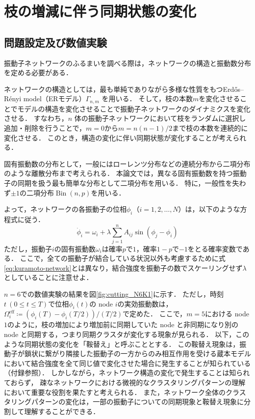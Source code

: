 \documentclass[../main]{subfiles}
\begin{document}
\chapter{枝の増減に伴う同期状態の変化}
\label{chap:method-3body}
\section{問題設定及び数値実験}
\label{sec:method-3body-settting}
振動子ネットワークのふるまいを調べる際は，ネットワークの構造と振動数分布を定める必要がある．

ネットワークの構造としては，最も単純でありながら多様な性質をもつErd\H{o}s–R\'{e}nyi model（ERモデル）$\Gamma_{n,m}$ を用いる．
そして，枝の本数$m$を変化させることでモデルの構造を変化させることで振動子ネットワークのダイナミクスを変化させる．
すなわち，$n$ 体の振動子ネットワークにおいて枝をランダムに選択し追加・削除を行うことで，$m=0$から$m=n(n-1)/2$まで枝の本数を連続的に変化させる．
このとき，構造の変化に伴い同期状態が変化することが考えられる．

固有振動数の分布として，一般にはローレンツ分布などの連続分布\cite{kuramoto1975}から二項分布のような離散分布\cite{1992BonillaNeuSpigler}まで考えられる．
本論文では，異なる固有振動数を持つ振動子の同期を扱う最も簡単な分布として二項分布を用いる．
特に，一般性を失わず$\pm 1$の二項分布$\operatorname{Bin}(n,p)$を用いる．

よって，ネットワークの各振動子の位相$\phi_i$（$i=1,2,\ldots,N$）は，以下のような方程式に従う．
\begin{equation}
    \dot{\phi}_i=\omega_i+\lambda\sum_{j=1}^n A_{ij}\sin(\phi_j-\phi_i)
\end{equation}
ただし，振動子$i$の固有振動数$\omega_i$は確率$p$で$1$，確率$1-p$で$-1$をとる確率変数である．
ここで，全ての振動子が結合している状況以外も考慮するために式\eqref{eq:kuramoto-network}とは異なり，結合強度を振動子の数でスケーリングせず$\lambda$としていることに注意せよ．

$n=6$での数値実験の結果を図\ref{fig:cutting_N6K1}に示す．
ただし，時刻$t\ (0\leq t\leq T)$で位相$\phi_i(t)$の node $i$の実効振動数は，$\Omega_i^{\mathrm{eff}}\coloneqq(\phi_i(T)-\phi_i(T/2))/(T/2)$で定めた．
ここで，$m=5$における node $1$のように，枝の増加により増加前に同期していた node と非同期になり別の node と同期する，つまり同期クラスタが変化する現象が見られる．
以下，このような同期状態の変化を「鞍替え」と呼ぶこととする．
この鞍替え現象は，振動子が鎖状に繋がり隣接した振動子の一方からのみ相互作用を受ける蔵本モデルにおいて結合強度を全て同じ値で変化させた場合に発生することが知られている\cite{XiaHuang:130506}（付録参照）．
しかしながら，ネットワーク構造の変化で発生することは知られておらず，
疎なネットワークにおける微視的なクラスタリングパターンの理解において重要な役割を果たすと考えられる．
また，ネットワーク全体のクラスタリングパターンの変化は，一部の振動子についての同期現象と鞍替え現象に分割して理解することができる．
\end{document}

